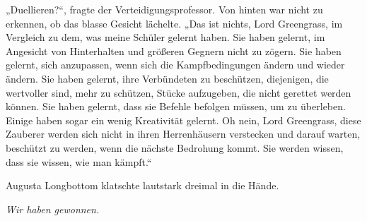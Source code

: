 „Duellieren?“, fragte der Verteidigungsprofessor. Von hinten war nicht zu erkennen, ob das blasse Gesicht lächelte. „Das ist nichts, Lord Greengrass, im Vergleich zu dem, was meine Schüler gelernt haben. Sie haben gelernt, im Angesicht von Hinterhalten und größeren Gegnern nicht zu zögern. Sie haben gelernt, sich anzupassen, wenn sich die Kampfbedingungen ändern und wieder ändern. Sie haben gelernt, ihre Verbündeten zu beschützen, diejenigen, die wertvoller sind, mehr zu schützen, Stücke aufzugeben, die nicht gerettet werden können. Sie haben gelernt, dass sie Befehle befolgen müssen, um zu überleben. Einige haben sogar ein wenig Kreativität gelernt. Oh nein, Lord Greengrass, diese Zauberer werden sich nicht in ihren Herrenhäusern verstecken und darauf warten, beschützt zu werden, wenn die nächste Bedrohung kommt. Sie werden wissen, dass sie wissen, wie man kämpft.“

Augusta Longbottom klatschte lautstark dreimal in die Hände.

\later

\emph{Wir haben gewonnen.}

